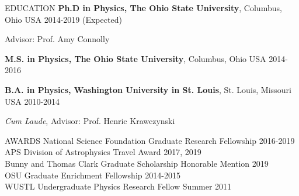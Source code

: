 \documentclass{resume} %
\newenvironment{list1}{
  \begin{list}{\ding{113}}{%
      \setlength{\itemsep}{0in}
      \setlength{\parsep}{0in} \setlength{\parskip}{0in}
      \setlength{\topsep}{0in} \setlength{\partopsep}{0in} 
      \setlength{\leftmargin}{0.17in}}}{\end{list}}
\begin{document}

\begin{rSection}{EDUCATION}
\textbf{Ph.D in Physics, The Ohio State University}, Columbus, Ohio USA \hfill 2014-2019 (Expected)\\
\vspace*{-.15in}
\begin{list1}
\item[]Advisor: Prof. Amy Connolly
\end{list1}

\textbf{M.S. in Physics, The Ohio State University}, Columbus, Ohio USA \hfill 2014-2016

\textbf{B.A. in Physics, Washington University in St. Louis}, St. Louis, Missouri USA \hfill 2010-2014\\
\vspace*{-.15in}
\begin{list1}
\item[] \textit{Cum Laude}, Advisor: Prof. Henric Krawczynski
\end{list1}
\end{rSection}


\begin{rSection}{AWARDS}
National Science Foundation Graduate Research Fellowship \hfill 2016-2019 \\
APS Division of Astrophysics Travel Award \hfill 2017, 2019 \\
Bunny and Thomas Clark Graduate Scholarship Honorable Mention \hfill 2019 \\
OSU Graduate Enrichment Fellowship \hfill 2014-2015 \\
WUSTL Undergraduate Physics Research Fellow \hfill Summer 2011 
\end{rSection}

\end{document}
